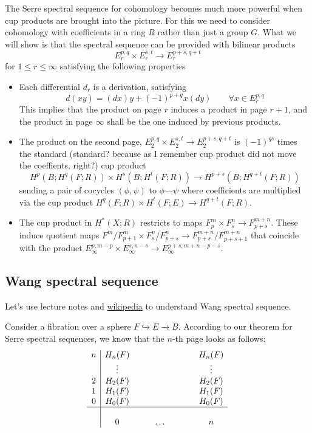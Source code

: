 The Serre spectral sequence for cohomology becomes much more powerful when cup products are brought into the picture. For this we need to consider cohomology with coefficients in a ring $R$ rather than just a group $G$. What we will show is that the spectral sequence can be provided with bilinear products
\[E^{p,q}_{r}\times E^{s,t}_{r}\to E^{p+s,q+t}_{r}\]
for $1\leq r\leq \infty$ satisfying the following properties
\begin{itemize}
	\item Each differential $d_{r}$ is a derivation, satisfying
		\[d(xy)=(dx)y+(-1)^{p+q} x(dy)\qquad \forall x\in E^{p,q}_{r}\]
	This implies that the product on page $r$ induces a product in page $r+1$, and the product in page $\infty$ shall be the one induced by previous products.
	\item The product on the second page, $E^{p,q}_{2}\times E^{s,t}_{2}\to E^{p+s,q+t}_{2}$ is $(-1)^{qs}$ times the standard {\color{magenta}(standard? because as I remember cup product did not move the coeffients, right?)} cup product
		\[H^{p}(B;H^{q}(F;R))\times H^{s}(B;H^{t}(F;R))\to H^{p+s}(B;H^{q+t}(F;R))\]
		sending a pair of cocycles $(\phi,\psi)$ to $\phi\smile \psi$ {\color{magenta}where coefficients are multiplied via the cup product $H^{q}(F;R)\times H^{t}(F;E)\to H^{q+t}(F;R)$}.
	\item The cup product in $H^{*}(X;R)$ restricts to maps $F^{m}_{p}\times F^{n}_{s}\to F^{m+n}_{p+s}$. These induce quotient maps $F^{ m}/F^{m}_{p+1}\times F^{n}_s/F^{n}_{p+s}\to F^{m+n}_{p+s}/F^{m+n}_{p+s+1}$ that coincide with the product $E^{p,m-p}_{\infty}\times E^{s,n-s}_{\infty}\to E^{p+s,m+n-p-s}_{\infty}$.
\end{itemize}

\subsection{Wang spectral sequence}

Let's use lecture notes and \href{https://en.wikipedia.org/wiki/Spectral_sequence#Wang_sequence}{wikipedia} to understand Wang spectral sequence.

Consider a fibration over a sphere $F\hookrightarrow E\to B$. According to our theorem for Serre spectral sequences, we know that the $n$-th page looks as follows:
\begin{align*}
\begin{array}{c|cccccccc}
	n&H_n(F)&&&&&&&H_{n}(F)\\
	 &\vdots&&&&&&&\vdots\\
	2&H_2(F)&&&&&&&H_2(F)\\
	1&H_1(F)&&&&&&&H_1(F)\\
	0&H_0(F)&&&&&&&H_0(F)\\
	\hline\\
	 &0&&&\ldots&&&&n
\end{array}
\end{align*}

